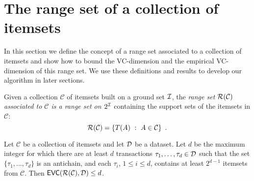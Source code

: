 \section{The range set of a collection of itemsets}\label{sec:range}
In this section we define the concept of a range set associated to a
collection of itemsets and show how to bound the VC-dimension and the
empirical VC-dimension of this range set. We use these definitions and results
to develop our algorithm in later sections.

\begin{definition}\label{def:rangeset}
Given a collection $\mathcal{C}$ of itemsets built on a ground set ${\cal I}$, the
\emph{range set $\mathcal{R}(\mathcal{C})$ associated to $\mathcal{C}$ is a range
set on $2^{\cal I}$} containing the support sets of the itemsets in $\mathcal{C}$:
\[\mathcal{R}(\mathcal{C})=\{T(A) ~:~ A\in\mathcal{C}\}\enspace.\]
\end{definition}


\begin{theorem}\label{lem:evcdimupbound}
  Let $\mathcal{C}$ be a collection of itemsets and let ${\cal D}$ be a dataset. Let
  $d$ be the maximum integer for which there are at least $d$
  transactions $\tau_1,\dotsc,\tau_d\in {\cal D}$ such that the set
  $\{\tau_1,\dotsc,\tau_d\}$ is an antichain, and each $\tau_i$, $1\le i\le d$,
  contains at least $2^{d-1}$ itemsets from $\mathcal{C}$. 
  Then $\mathsf{EVC}(\mathcal{R}(\mathcal{C}),{\cal D})\le d$.
\end{theorem}

